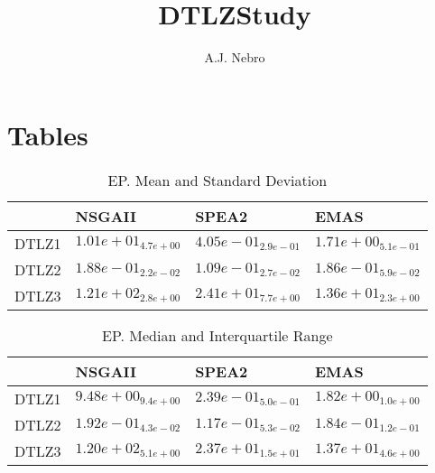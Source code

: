\documentclass{article}
\title{DTLZStudy}
\author{A.J. Nebro}
\begin{document}
\maketitle
\section{Tables}

\begin{table}
\caption{EP. Mean and Standard Deviation}
\label{table: EP}
\centering
\begin{scriptsize}
\begin{tabular}{llll}
\hline & NSGAII & SPEA2 &  EMAS\\
\hline 
DTLZ1 & $  1.01e+01_{ 4.7e+00}$ & \cellcolor{gray95}$  4.05e-01_{ 2.9e-01}$ & \cellcolor{gray25}$  1.71e+00_{ 5.1e-01}$ \\
DTLZ2 & $  1.88e-01_{ 2.2e-02}$ & \cellcolor{gray95}$  1.09e-01_{ 2.7e-02}$ & \cellcolor{gray25}$  1.86e-01_{ 5.9e-02}$ \\
DTLZ3 & $  1.21e+02_{ 2.8e+00}$ & \cellcolor{gray25}$  2.41e+01_{ 7.7e+00}$ & \cellcolor{gray95}$  1.36e+01_{ 2.3e+00}$ \\
\hline
\end{tabular}
\end{scriptsize}
\end{table}

\begin{table}
\caption{EP. Median and Interquartile Range}
\label{table: EP}
\centering
\begin{scriptsize}
\begin{tabular}{llll}
\hline & NSGAII & SPEA2 &  EMAS\\
\hline 
DTLZ1 & $  9.48e+00_{ 9.4e+00}$ & \cellcolor{gray95}$  2.39e-01_{ 5.0e-01}$ & \cellcolor{gray25}$  1.82e+00_{ 1.0e+00}$ \\
DTLZ2 & $  1.92e-01_{ 4.3e-02}$ & \cellcolor{gray95}$  1.17e-01_{ 5.3e-02}$ & \cellcolor{gray25}$  1.84e-01_{ 1.2e-01}$ \\
DTLZ3 & $  1.20e+02_{ 5.1e+00}$ & \cellcolor{gray25}$  2.37e+01_{ 1.5e+01}$ & \cellcolor{gray95}$  1.37e+01_{ 4.6e+00}$ \\
\hline
\end{tabular}
\end{scriptsize}
\end{table}
\end{document}

